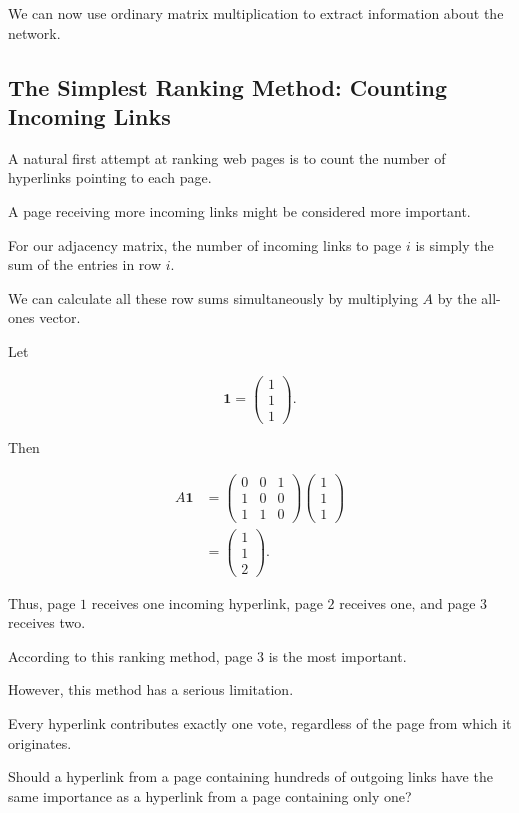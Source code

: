 \documentclass[11pt,a4paper]{article}
\theoremstyle{definition}
\theoremstyle{remark}
\begin{document}
We can now use ordinary
matrix multiplication
to extract information
about the network.


\subsection{The Simplest Ranking Method:
Counting Incoming Links}

A natural first attempt
at ranking web pages
is to count the number
of hyperlinks pointing
to each page.

A page receiving more
incoming links might
be considered more important.

For our adjacency matrix,
the number of incoming
links to page $i$
is simply the sum of
the entries in row $i$.

We can calculate all these
row sums simultaneously
by multiplying $A$
by the all-ones vector.

Let

\[
\mathbf{1}
=
\begin{pmatrix}
1\\1\\1
\end{pmatrix}.
\]

Then

\[
\begin{aligned}
A\mathbf{1}
&=
\begin{pmatrix}
0&0&1\\
1&0&0\\
1&1&0
\end{pmatrix}
\begin{pmatrix}
1\\1\\1
\end{pmatrix}\\[2mm]
&=
\begin{pmatrix}
1\\1\\2
\end{pmatrix}.
\end{aligned}
\]

Thus, page $1$ receives
one incoming hyperlink,
page $2$ receives one,
and page $3$ receives two.

According to this ranking
method, page $3$ is
the most important.

However, this method
has a serious limitation.

Every hyperlink contributes
exactly one vote,
regardless of the page
from which it originates.

Should a hyperlink from
a page containing hundreds
of outgoing links have
the same importance as
a hyperlink from a page
containing only one?
\end{document}
